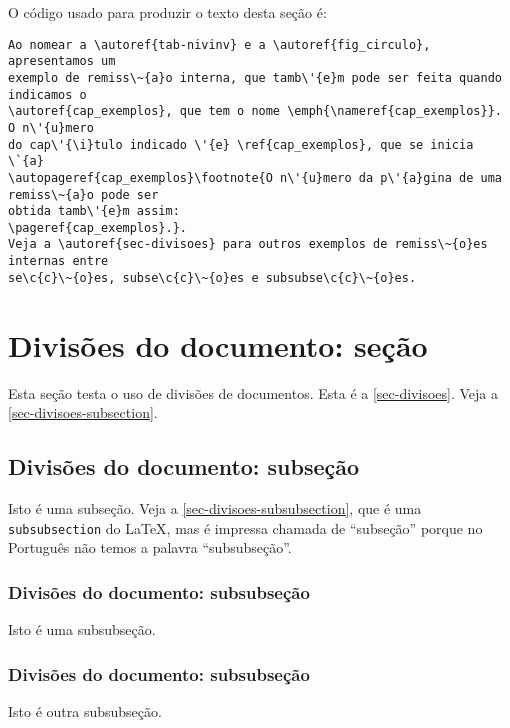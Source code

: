 O c\'{o}digo usado para produzir o texto desta se\c{c}\~{a}o \'{e}:

\begin{verbatim}
Ao nomear a \autoref{tab-nivinv} e a \autoref{fig_circulo}, apresentamos um
exemplo de remiss\~{a}o interna, que tamb\'{e}m pode ser feita quando indicamos o
\autoref{cap_exemplos}, que tem o nome \emph{\nameref{cap_exemplos}}. O n\'{u}mero
do cap\'{\i}tulo indicado \'{e} \ref{cap_exemplos}, que se inicia \`{a}
\autopageref{cap_exemplos}\footnote{O n\'{u}mero da p\'{a}gina de uma remiss\~{a}o pode ser
obtida tamb\'{e}m assim:
\pageref{cap_exemplos}.}.
Veja a \autoref{sec-divisoes} para outros exemplos de remiss\~{o}es internas entre
se\c{c}\~{o}es, subse\c{c}\~{o}es e subsubse\c{c}\~{o}es.
\end{verbatim}

\section{Divis\~{o}es do documento: se\c{c}\~{a}o}\label{sec-divisoes}

Esta se\c{c}\~{a}o testa o uso de divis\~{o}es de documentos. Esta \'{e} a
\autoref{sec-divisoes}. Veja a \autoref{sec-divisoes-subsection}.

\subsection{Divis\~{o}es do documento: subse\c{c}\~{a}o}\label{sec-divisoes-subsection}

Isto \'{e} uma subse\c{c}\~{a}o. Veja a \autoref{sec-divisoes-subsubsection}, que \'{e} uma
\texttt{subsubsection} do \LaTeX, mas \'{e} impressa chamada de ``subse\c{c}\~{a}o'' porque
no Portugu\^{e}s n\~{a}o temos a palavra ``subsubse\c{c}\~{a}o''.

\subsubsection{Divis\~{o}es do documento: subsubse\c{c}\~{a}o}
\label{sec-divisoes-subsubsection}

Isto \'{e} uma subsubse\c{c}\~{a}o.

\subsubsection{Divis\~{o}es do documento: subsubse\c{c}\~{a}o}

Isto \'{e} outra subsubse\c{c}\~{a}o.

